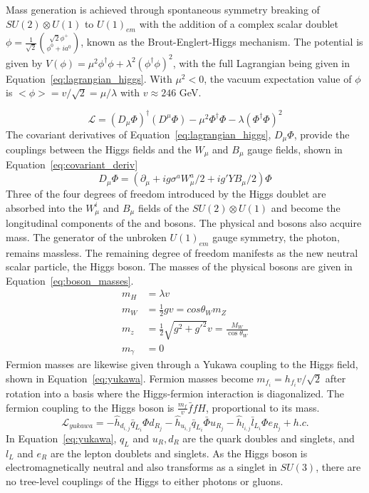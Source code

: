 Mass generation is achieved through spontaneous symmetry breaking of $SU(2)\otimes U(1)$ to $U(1)_{em}$ with the addition of a complex scalar doublet $\phi = \frac{1}{\sqrt{2}}\binom{\sqrt{2}\phi^+}{\phi^0 + ia^0}$, known as the Brout-Englert-Higgs mechanism\cite{ewsb1,ewsb2,ewsb3}. The potential is given by $V(\phi) = \mu^2\phi^\dagger\phi + \lambda^2(\phi^\dagger \phi)^2$, with the full Lagrangian being given in Equation~\ref{eq:lagrangian_higgs}. With $\mu^2 < 0$, the vacuum expectation value of $\phi$ is $<\phi> = v/\sqrt{2} = \mu/\lambda$ with $v\approx 246$ GeV. 


\begin{equation}
    \mathcal{L} = (D_\mu\Phi)^\dagger(D^\mu\Phi) - \mu^2 \Phi^\dagger\Phi - \lambda(\Phi^\dagger\Phi)^2
    \label{eq:lagrangian_higgs}
\end{equation}
The covariant derivatives of Equation~\ref{eq:lagrangian_higgs}, $D_\mu\Phi$, provide the couplings between the Higgs fields and the $W_\mu$ and $B_\mu$ gauge fields, shown in Equation~\ref{eq:covariant_deriv}
\begin{equation}
    D_\mu \Phi = (\partial_\mu + ig\sigma^aW_\mu^a/2 + ig'YB_\mu/2)\Phi
    \label{eq:covariant_deriv}
\end{equation}
Three of the four degrees of freedom introduced by the Higgs doublet are absorbed into the $W^i_\mu$ and $B_\mu$ fields of the $SU(2)\otimes U(1)$ and become the longitudinal components of the \W and \Z bosons. The physical \W and \Z bosons also acquire mass. The generator of the unbroken $U(1)_{em}$ gauge symmetry, the photon, remains massless. The remaining degree of freedom manifests as the new neutral scalar particle, the Higgs boson. The masses of the physical bosons are given in Equation~\ref{eq:boson_masses}.
\begin{equation}
\begin{aligned}
m_H &= \lambda v \\ 
m_W &= \frac{1}{2}g v = cos\theta_W m_Z \\ 
m_z &= \frac{1}{2}\sqrt{g^2+g'^2}v  = \frac{M_W}{\cos{\theta_W}}\\ 
m_\gamma &= 0
\end{aligned}
\label{eq:boson_masses}
\end{equation}
Fermion masses are likewise given through a Yukawa coupling to the Higgs field, shown in Equation~\ref{eq:yukawa}. Fermion masses become $m_{f_i} = h_{f_i} v / \sqrt{2}$ after rotation into a basis where the Higgs-fermion interaction is diagonalized. The fermion coupling to the Higgs boson is $\frac{m_f}{v}\bar{f}fH$, proportional to its mass.
\begin{equation}
\mathcal{L}_{yukawa} = -\hat{h}_{d_{i,j}}\bar{q}_{L_i}\Phi d_{R_j} - \hat{h}_{u_{i,j}}\bar{q}_{L_i}\bar{\Phi} u_{R_j} -\hat{h}_{l_{i,j}}\bar{l}_{L_i}\Phi e_{R_j} + h.c.
    \label{eq:yukawa}
\end{equation}
In Equation~\ref{eq:yukawa}, $q_L$ and $u_R,d_R$ are the quark doubles and singlets, and $l_L$ and $e_R$ are the lepton doublets and singlets. As the Higgs boson is electromagnetically neutral and also transforms as a singlet in $SU(3)$, there are no tree-level couplings of the Higgs to either photons or gluons.

